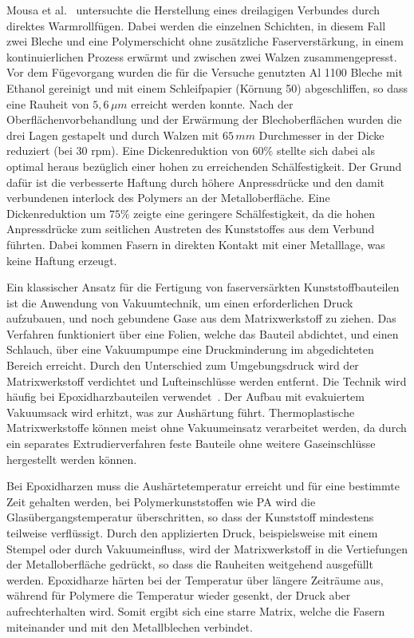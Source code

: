 Mousa et al.~\cite{Mousa.2017} untersuchte die Herstellung eines dreilagigen Verbundes durch direktes Warmrollfügen.
Dabei werden die einzelnen Schichten, in diesem Fall zwei Bleche und eine Polymerschicht ohne zusätzliche Faserverstärkung, in einem kontinuierlichen Prozess erwärmt und zwischen zwei Walzen zusammengepresst.
Vor dem Fügevorgang wurden die für die Versuche genutzten Al 1100 Bleche mit Ethanol gereinigt und mit einem Schleifpapier (Körnung 50) abgeschliffen, so dass eine Rauheit von $5,6\, \mu m$ erreicht werden konnte.
Nach der Oberflächenvorbehandlung und der Erwärmung der Blechoberflächen wurden die drei Lagen gestapelt und durch Walzen mit $65\, mm$ Durchmesser in der Dicke reduziert (bei 30 rpm).
Eine Dickenreduktion von $60 \%$ stellte sich dabei als optimal heraus bezüglich einer hohen zu erreichenden Schälfestigkeit.
Der Grund dafür ist die verbesserte Haftung durch höhere Anpressdrücke und den damit verbundenen interlock des Polymers an der Metalloberfläche.
Eine Dickenreduktion um $75\%$ zeigte eine geringere Schälfestigkeit, da die hohen Anpressdrücke zum seitlichen Austreten des Kunststoffes aus dem Verbund führten.
Dabei kommen Fasern in direkten Kontakt mit einer Metalllage, was keine Haftung erzeugt.

Ein klassischer Ansatz für die Fertigung von faserversärkten Kunststoffbauteilen ist die Anwendung von Vakuumtechnik, um einen erforderlichen Druck aufzubauen, und noch gebundene Gase aus dem Matrixwerkstoff zu ziehen.
Das Verfahren funktioniert über eine Folien, welche das Bauteil abdichtet, und einen Schlauch, über eine Vakuumpumpe eine Druckminderung im abgedichteten Bereich erreicht.
Durch den Unterschied zum Umgebungsdruck wird der Matrixwerkstoff verdichtet und Lufteinschlüsse werden entfernt.
Die Technik wird häufig bei Epoxidharzbauteilen verwendet~\cite{Bellini.2020}.
Der Aufbau mit evakuiertem Vakuumsack wird erhitzt, was zur Aushärtung führt.
Thermoplastische Matrixwerkstoffe können meist ohne Vakuumeinsatz verarbeitet werden, da durch ein separates Extrudierverfahren feste Bauteile ohne weitere Gaseinschlüsse hergestellt werden können.

Bei Epoxidharzen muss die Aushärtetemperatur erreicht und für eine bestimmte Zeit gehalten werden, bei Polymerkunststoffen wie PA wird die Glasübergangstemperatur überschritten, so dass der Kunststoff mindestens teilweise verflüssigt.
Durch den applizierten Druck, beispielsweise mit einem Stempel oder durch Vakuumeinfluss, wird der Matrixwerkstoff in die Vertiefungen der Metalloberfläche gedrückt, so dass die Rauheiten weitgehend ausgefüllt werden.
Epoxidharze härten bei der Temperatur über längere Zeiträume aus, während für Polymere die Temperatur wieder gesenkt, der Druck aber aufrechterhalten wird.
Somit ergibt sich eine starre Matrix, welche die Fasern miteinander und mit den Metallblechen verbindet.~\cite{Sinmazcelik.2011}

